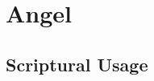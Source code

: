 \section{Angel}
	\label{ANGEL}
	





\subsection{Scriptural Usage} %
	\label{ANGEL-SCRIPTURES}

	
	
